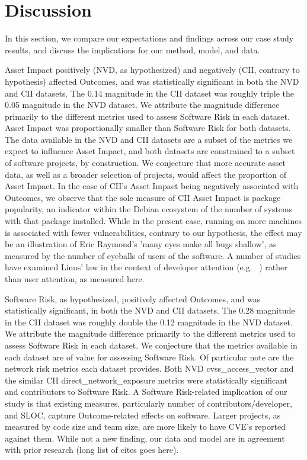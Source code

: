 \section{Discussion}
\label{sec:discussion}

In this section, we compare our expectations and findings across our case study results, and discuss the implications for our method, model, and data.

%		
Asset Impact positively (NVD, as hypothesized) and negatively (CII, contrary to hypothesis) affected Outcomes, and was statistically significant in both the NVD and CII datasets. The 0.14 magnitude in the CII dataset was roughly triple the 0.05 magnitude in the NVD dataset. We attribute the magnitude difference primarily to the different metrics used to assess Software Risk in each dataset. Asset Impact was proportionally smaller than Software Risk for both datasets. The data available in the NVD and CII datasets are a subset of the metrics we expect to influence Asset Impact, and both datasets are constrained to a subset of software projects, by construction. We conjecture that more accurate asset data, as well as a broader selection of projects, would affect the proportion of Asset Impact. In the case of CII's Asset Impact being negatively associated with Outcomes, we observe that the sole measure of CII Asset Impact is package popularity, an indicator within the Debian ecosystem of the number of systems with that package installed. While in the present case, running on more machines is associated with fewer vulnerabilities, contrary to our hypothesis, the effect may be an illustration of Eric Raymond's 'many eyes make all bugs shallow', as measured by the number of eyeballs of users of the software. A number of studies have examined Linus' law in the context of developer attention (e.g. ~\cite{meneely2013when}) rather than user attention, as measured here. 

Software Risk, as hypothesized, positively affected Outcomes, and was statistically significant, in both the NVD and CII datasets. The 0.28 magnitude in the CII dataset was roughly double the 0.12 magnitude in the NVD dataset. We attribute the magnitude difference primarily to the different metrics used to assess Software Risk in each dataset. We conjecture that the metrics available in each dataset are of value for assessing Software Risk.  Of particular note are the network risk metrics each dataset provides. Both NVD cvss\_access\_vector and the similar CII direct\_network\_exposure metrics were statistically significant and contributors to Software Risk. A Software Risk-related implication of our study is that existing measures, particularly number of contributors/developer, and SLOC, capture Outcome-related effects on software. Larger projects, as measured by code size and team size, are more likely to have CVE's reported against them. While not a new finding, our data and model are in agreement with prior research (long list of cites goes here).

